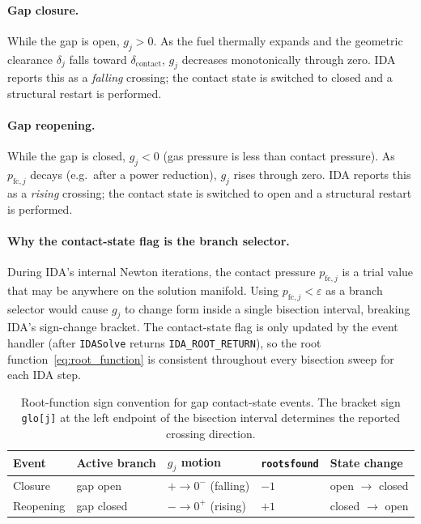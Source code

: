 \begin{refsection}
\paragraph{Gap closure.} While the gap is open, $g_j > 0$. As the fuel thermally expands and the geometric clearance $\delta_j$ falls toward $\delta_\mathrm{contact}$, $g_j$ decreases monotonically through zero. IDA reports this as a \emph{falling} crossing; the contact state is switched to closed and a structural restart is performed.

\paragraph{Gap reopening.} While the gap is closed, $g_j < 0$ (gas pressure is less than contact pressure). As $p_{\mathrm{fc},j}$ decays (e.g.\ after a power reduction), $g_j$ rises through zero. IDA reports this as a \emph{rising} crossing; the contact state is switched to open and a structural restart is performed.

\paragraph{Why the contact-state flag is the branch selector.} During IDA's internal Newton iterations, the contact pressure $p_{\mathrm{fc},j}$ is a trial value that may be anywhere on the solution manifold. Using $p_{\mathrm{fc},j} < \varepsilon$ as a branch selector would cause $g_j$ to change form inside a single bisection interval, breaking IDA's sign-change bracket. The contact-state flag is only updated by the event handler (after \texttt{IDASolve} returns \texttt{IDA\_ROOT\_RETURN}), so the root function~\eqref{eq:root_function} is consistent throughout every bisection sweep for each IDA step.

\begin{table}[H]
  \centering
  \caption{Root-function sign convention for gap contact-state events.
           The bracket sign \texttt{glo[j]} at the left endpoint of the bisection interval
           determines the reported crossing direction.}
  \label{tab:root_signs}
  \begin{tabular}{lp{3cm}p{3cm}p{2.5cm}p{3cm}}
    \toprule
    Event & Active branch & $g_j$ motion & \texttt{rootsfound} & State change \\
    \midrule
    Closure   & gap open & $+\to 0^-$ (falling) & $-1$ & open $\to$ closed \\
    Reopening & gap closed & $-\to 0^+$ (rising)  & $+1$ & closed $\to$ open \\
    \bottomrule
  \end{tabular}
\end{table}


\end{refsection}
